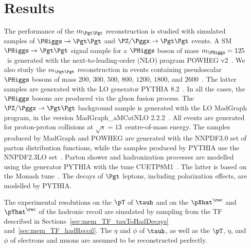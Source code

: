 \section{Results}
\label{sec:results}

The performance of the $m_{\Pgt\Pgt}$ reconstruction is studied with
simulated samples of $\PHiggs \to \Pgt\Pgt$ and $\PZ/\Pggx \to \Pgt\Pgt$ events.
A SM $\PHiggs \to \Pgt\Pgt$ signal sample for a $\PHiggs$ boson of
mass $m_{\PHiggs} = 125$~\GeV is generated with the next-to-leading-order (NLO) program POWHEG v2~\cite{POWHEG1,POWHEG2,POWHEG3}.
We also study the $m_{\Pgt\Pgt}$ reconstruction in events containing pseudoscalar $\PHiggs$ bosons of mass $200$, $300$, $500$, $800$, $1200$, $1800$, and $2600$~\GeV.
The latter samples are generated with the LO generator PYTHIA 8.2~\cite{pythia8}.
In all the cases, the $\PHiggs$ bosons are produced via the gluon fusion process.
The $\PZ/\Pggx \to \Pgt\Pgt$ background sample is generated with the LO MadGraph program, in the version MadGraph\_aMCatNLO 2.2.2~\cite{MadGraph_aMCatNLO}.
All events are generated for proton-proton collisions at $\sqrt{s} = 13$~\TeV centre-of-mass energy.
The samples produced by MadGraph and POWHEG are generated with the NNPDF3.0 set of parton distribution functions,
while the samples produced by PYTHIA use the NNPDF2.3LO set~\cite{NNPDF1,NNPDF2,NNPDF3}.
Parton shower and hadronization processes are modelled using the generator PYTHIA with the tune CUETP8M1~\cite{PYTHIA_CUETP8M1tune_CMS}.
The latter is based on the Monash tune~\cite{PYTHIA_MonashTune}.
The decays of $\Pgt$ leptons, including polarization effects, are modelled by PYTHIA.

The experimental resolutions on the $\pT$ of $\tauh$ and on the $\pXhat^{\rec}$ and $\pYhat^{\rec}$ of the hadronic recoil 
are simulated by sampling from the TF described in
Sections~\ref{sec:mem_TF_tauToHadDecays}
and~\ref{sec:mem_TF_hadRecoil}.
The $\eta$ and $\phi$ of $\tauh$,
as well as the $\pT$, $\eta$, and $\phi$ of electrons and muons are assumed to be reconstructed perfectly.


